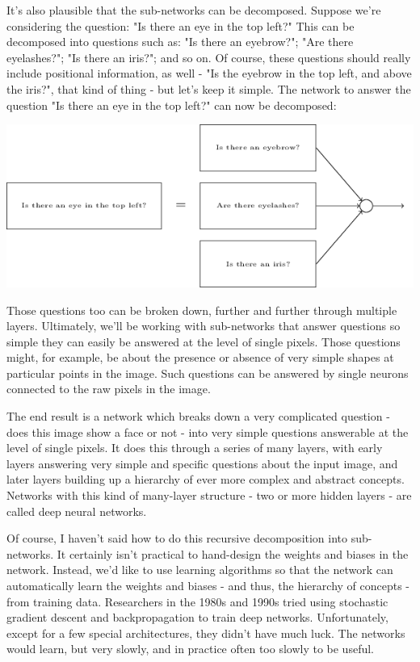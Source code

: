 \documentclass[a4paper,12pt]{report}%
\begin{document}
It's also plausible that the sub-networks can be decomposed. Suppose we're considering the question: "Is there an eye in the top left?" This can be decomposed into questions such as: "Is there an eyebrow?"; "Are there eyelashes?"; "Is there an iris?"; and so on. Of course, these questions should really include positional information, as well - "Is the eyebrow in the top left, and above the iris?", that kind of thing - but let's keep it simple. The network to answer the question "Is there an eye in the top left?" can now be decomposed:

\begin{center}
 \includegraphics[width=0.8\linewidth]{images/tikz15.png}
\end{center}

Those questions too can be broken down, further and further through multiple layers. Ultimately, we'll be working with sub-networks that answer questions so simple they can easily be answered at the level of single pixels. Those questions might, for example, be about the presence or absence of very simple shapes at particular points in the image. Such questions can be answered by single neurons connected to the raw pixels in the image.

\smallskip

The end result is a network which breaks down a very complicated question - does this image show a face or not - into very simple questions answerable at the level of single pixels. It does this through a series of many layers, with early layers answering very simple and specific questions about the input image, and later layers building up a hierarchy of ever more complex and abstract concepts. Networks with this kind of many-layer structure - two or more hidden layers - are called deep neural networks.

\smallskip

Of course, I haven't said how to do this recursive decomposition into sub-networks. It certainly isn't practical to hand-design the weights and biases in the network. Instead, we'd like to use learning algorithms so that the network can automatically learn the weights and biases - and thus, the hierarchy of concepts - from training data. Researchers in the 1980s and 1990s tried using stochastic gradient descent and backpropagation to train deep networks. Unfortunately, except for a few special architectures, they didn't have much luck. The networks would learn, but very slowly, and in practice often too slowly to be useful.
\end{document}
